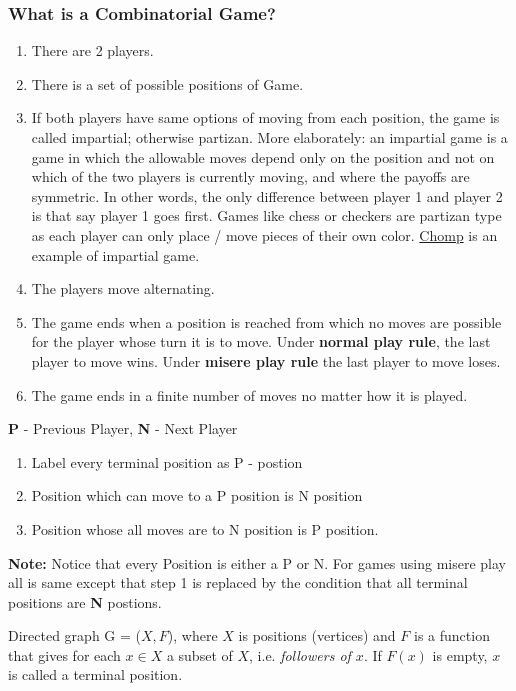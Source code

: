 \documentclass[8pt, a4paper, oneside, twocolumn]{extarticle}
\begin{document}
\subsubsection{What is a Combinatorial Game?}
\begin{enumerate}
\item There are 2 players.
\item There is a set of possible positions of Game.
\item If both players have same options of moving from each position, the game is called impartial; otherwise partizan. More elaborately: an impartial game is a game in which the allowable moves depend only on the position and not on which of the two players is currently moving, and where the payoffs are symmetric. In other words, the only difference between player 1 and player 2 is that say player 1 goes first. Games like chess or checkers are partizan type as each player can only place / move pieces of their own color. \href{https://en.wikipedia.org/wiki/Chomp}{Chomp} is an example of impartial game.
\item The players move alternating.
\item The game ends when a position is reached from which no moves are possible for the player whose turn it is to move. Under \textbf {normal play rule}, the last player to move wins. Under \textbf {misere play rule} the last player to move loses.
\item The game ends in a finite number of moves no matter how it is played.
\end{enumerate}
\textbf{P} - Previous Player, \textbf{N} - Next Player
\begin{enumerate}
\item Label every terminal position as P - postion
\item Position which can move to a P position is N position
\item Position whose all moves are to N position is P position.
\end{enumerate}

\textbf{Note: } Notice that every Position is either a P or N. For games using misere play all is same except that step 1 is replaced by the condition that all terminal positions are \textbf{N} postions.

Directed graph G = ($X, F$), where $X$ is positions (vertices) and $F$ is a function that gives for each $x \in X$ a subset of $X$, i.e. \textit {followers of $x$}. If $F (x)$ is empty, $x$ is called a terminal position.
\end{document}
